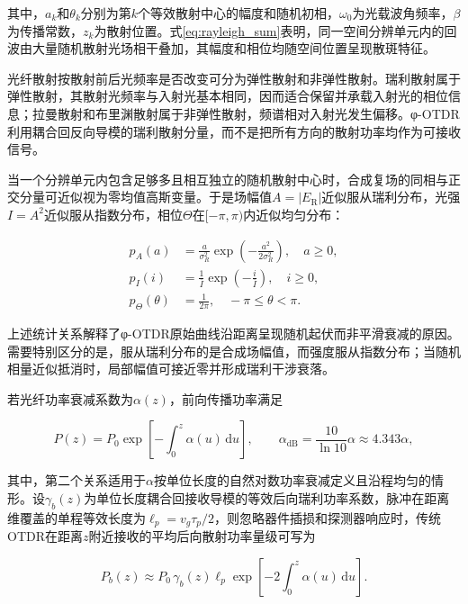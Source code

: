 其中，$a_k$和$\theta_k$分别为第$k$个等效散射中心的幅度和随机初相，$\omega_0$为光载波角频率，$\beta$为传播常数，$z_k$为散射位置。式\eqref{eq:rayleigh_sum}表明，同一空间分辨单元内的回波由大量随机散射光场相干叠加，其幅度和相位均随空间位置呈现散斑特征\cite{posey2000strain,liokumovich2015fundamentals,he2021review,liu2022advances,liu2025rayleigh_thesis}。

光纤散射按散射前后光频率是否改变可分为弹性散射和非弹性散射。瑞利散射属于弹性散射，其散射光频率与入射光基本相同，因而适合保留并承载入射光的相位信息；拉曼散射和布里渊散射属于非弹性散射，频谱相对入射光发生偏移。φ-OTDR利用耦合回反向导模的瑞利散射分量，而不是把所有方向的散射功率均作为可接收信号。

当一个分辨单元内包含足够多且相互独立的随机散射中心时，合成复场的同相与正交分量可近似视为零均值高斯变量。于是场幅值$A=|E_{\mathrm R}|$近似服从瑞利分布，光强$I=A^2$近似服从指数分布，相位$\Theta$在$[-\pi,\pi)$内近似均匀分布：

\begin{align}
p_A(a)&=\frac{a}{\sigma_R^2}\exp\!\left(-\frac{a^2}{2\sigma_R^2}\right),\quad a\geq0,\label{eq:rayleigh_amplitude_pdf}\\
p_I(i)&=\frac{1}{\bar I}\exp\!\left(-\frac{i}{\bar I}\right),\quad i\geq0,\label{eq:rayleigh_intensity_pdf}\\
p_\Theta(\theta)&=\frac{1}{2\pi},\quad -\pi\leq\theta<\pi.
\label{eq:rayleigh_phase_pdf}
\end{align}

上述统计关系解释了φ-OTDR原始曲线沿距离呈现随机起伏而非平滑衰减的原因。需要特别区分的是，服从瑞利分布的是合成场幅值，而强度服从指数分布；当随机相量近似抵消时，局部幅值可接近零并形成瑞利干涉衰落。

若光纤功率衰减系数为$\alpha(z)$，前向传播功率满足

\begin{equation}
P(z)=P_0\exp\!\left[-\int_0^z\alpha(u)\,\mathrm du\right],
\qquad
\alpha_{\mathrm{dB}}=\frac{10}{\ln 10}\alpha\approx4.343\alpha,
\label{eq:fiber_power_attenuation}
\end{equation}

其中，第二个关系适用于$\alpha$按单位长度的自然对数功率衰减定义且沿程均匀的情形。设$\gamma_b(z)$为单位长度耦合回接收导模的等效后向瑞利功率系数，脉冲在距离维覆盖的单程等效长度为$\ell_p=v_g\tau_p/2$，则忽略器件插损和探测器响应时，传统OTDR在距离$z$附近接收的平均后向散射功率量级可写为

\begin{equation}
P_b(z)
\approx
P_0\,\gamma_b(z)\ell_p
\exp\!\left[-2\int_0^z\alpha(u)\,\mathrm du\right].
\label{eq:otdr_backscatter_power}
\end{equation}

